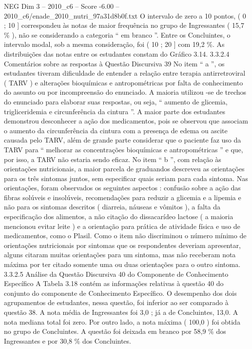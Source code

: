 \begin{textsample}{NEG Dim 3 – 2010\_c6 – Score -6.00 – 2010\_c6/enade\_2010\_nutri\_97a31d8b0f.txt}
O intervalo de zero a 10 pontos, ( 0 ; 10 ] correspondeu às notas de maior frequência no grupo de Ingressantes ( 15,7 \% ), não se considerando a categoria “ em branco ”.
Entre os Concluintes, o intervalo modal, sob a mesma consideração, foi ( 10 ; 20 ] com 19,2 \%.
As distribuições das notas entre os estudantes constam do Gráfico 3.14. 3.3.2.4 Comentários sobre as respostas à Questão Discursiva 39 No item “ a ”, os estudantes tiveram dificuldade de entender a relação entre terapia antirretroviral ( TARV ) e alterações bioquímicas e antropométricas por falta de conhecimento do assunto ou por incompreensão do enunciado.
A maioria utilizou -se de trechos do enunciado para elaborar suas respostas, ou seja, “ aumento de glicemia, trigliceridemia e circunferência da cintura ”.
A maior parte dos estudantes demonstrou desconhecer a ação dos medicamentos, pois se observou que associam o aumento da circunferência da cintura com a presença de edema ou ascite causada pelo TARV, além de grande parte considerar que o paciente faz uso da TARV para “ melhorar as concentrações bioquímicas e antropométricas ” e que, por isso, a TARV não estaria sendo eficaz.
No item “ b ”, com relação às orientações nutricionais, a maior parcela de graduandos descreveu as orientações para os três sintomas juntos, sem especificar quais seriam para cada sintoma.
Nas orientações, foram observados os seguintes aspectos : confusão sobre a ação das fibras solúveis e insolúveis, recomendações para reduzir a glicemia e a lipemia e não para os sintomas descritos ( diarreia, náuseas e vômitos ), a falta da especificação dos alimentos, a não citação do dissacarídeo lactose ( a maioria mencionou evitar leite ) e a orientação para prática de atividade física e uso de medicamentos, como o Plasil.
Como o item não discriminou o número mínimo de orientações nutricionais por sintomas que os respondentes deveriam apresentar, alguns citaram muitas orientações para um sintoma, mas não receberam nota máxima por ter citado somente uma ou duas orientações para o outro sintoma. 3.3.2.5 Análise da Questão Discursiva 40 do Componente de Conhecimento Específico A Tabela 3.18 contém as informações relativas à questão 40 do conjunto do componente de Conhecimento Específico.
O desempenho dos dois agrupamentos de estudantes, nessa questão, foi inferior ao ser comparado à questão 38.
A nota média de Ingressantes foi 3,0 ; já a de Concluintes, 13,0.
A nota mediana total foi zero.
Por outro lado, a nota máxima ( 100,0 ) foi obtida no grupo de Concluintes.
A questão foi deixada em branco por 58,9 \% dos Ingressantes e por 30,8 \% dos Concluintes.

\end{textsample}
